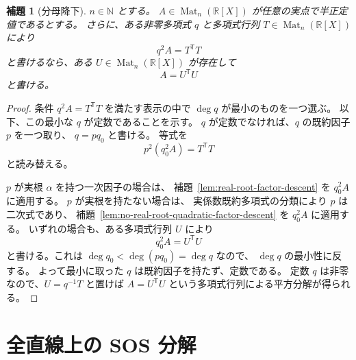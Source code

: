 \documentclass[uplatex,dvipdfmx]{jsarticle}
\newcommand{\Poly}{\mathbb{R}[X]}
\newcommand{\Mat}{\operatorname{Mat}}
\newcommand{\restateprefix}{}
\theoremstyle{matrixsosdefinition}
\newtheorem{lemma}[theorem]{補題}
\begin{document}
\begin{lemma}[分母降下]\label{lem:denominator-descent}
  \(n\in\mathbb{N}\) とする。
  \(A\in\Mat_n(\Poly)\) が任意の実点で半正定値であるとする。
  さらに、ある非零多項式 \(q\) と多項式行列 \(T\in\Mat_n(\Poly)\) により
  \[
    q^2A=T^{\mathsf T}T
  \]
  と書けるなら、ある \(U\in\Mat_n(\Poly)\) が存在して
  \[
    A=U^{\mathsf T}U
  \]
  と書ける。
\end{lemma}

\begin{proof}
  条件 \(q^2A=T^{\mathsf T}T\) を満たす表示の中で \(\deg q\) が最小のものを一つ選ぶ。
  以下、この最小な \(q\) が定数であることを示す。
  \(q\) が定数でなければ、\(q\) の既約因子 \(p\) を一つ取り、
  \(q=pq_0\) と書ける。
  等式を
  \[
    p^2(q_0^2A)=T^{\mathsf T}T
  \]
  と読み替える。

  \(p\) が実根 \(\alpha\) を持つ一次因子の場合は、
  補題~\ref{lem:real-root-factor-descent} を \(q_0^2A\) に適用する。
  \(p\) が実根を持たない場合は、
  実係数既約多項式の分類により \(p\) は二次式であり、
  補題~\ref{lem:no-real-root-quadratic-factor-descent} を
  \(q_0^2A\) に適用する。
  いずれの場合も、ある多項式行列 \(U\) により
  \[
    q_0^2A=U^{\mathsf T}U
  \]
  と書ける。これは \(\deg q_0<\deg(pq_0)=\deg q\) なので、
  \(\deg q\) の最小性に反する。
  よって最小に取った \(q\) は既約因子を持たず、定数である。
  定数 \(q\) は非零なので、\(U=q^{-1}T\) と置けば
  \(A=U^{\mathsf T}U\) という多項式行列による平方分解が得られる。
\end{proof}

\section{全直線上の SOS 分解}

{\renewcommand{\restateprefix}{再掲; }\fullLineMatrixSOS*}
\end{document}
